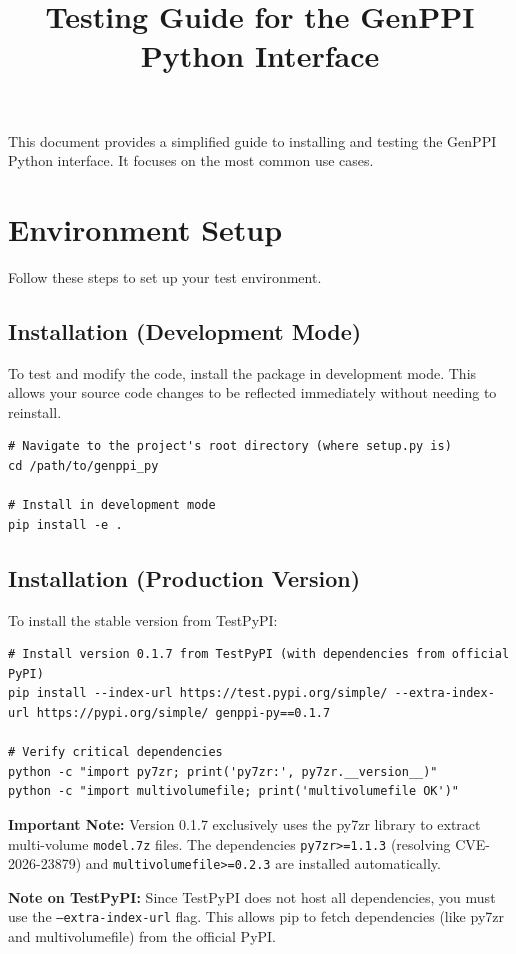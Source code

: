 \documentclass[11pt, a4paper]{article}
\title{\bfseries Testing Guide for the GenPPI Python Interface}
\author{}
\date{}
\begin{document}
\maketitle

This document provides a simplified guide to installing and testing the GenPPI Python interface. It focuses on the most common use cases.

\section{Environment Setup}
Follow these steps to set up your test environment.

\subsection{Installation (Development Mode)}
To test and modify the code, install the package in development mode. This allows your source code changes to be reflected immediately without needing to reinstall.

\begin{lstlisting}[style=bashstyle]
# Navigate to the project's root directory (where setup.py is)
cd /path/to/genppi_py

# Install in development mode
pip install -e .
\end{lstlisting}

\subsection{Installation (Production Version)}
To install the stable version from TestPyPI:

\begin{lstlisting}[style=bashstyle]
# Install version 0.1.7 from TestPyPI (with dependencies from official PyPI)
pip install --index-url https://test.pypi.org/simple/ --extra-index-url https://pypi.org/simple/ genppi-py==0.1.7

# Verify critical dependencies
python -c "import py7zr; print('py7zr:', py7zr.__version__)"
python -c "import multivolumefile; print('multivolumefile OK')"
\end{lstlisting}

\textbf{Important Note:} Version 0.1.7 exclusively uses the py7zr library to extract multi-volume \texttt{model.7z} files. The dependencies \texttt{py7zr>=1.1.3} (resolving CVE-2026-23879) and \texttt{multivolumefile>=0.2.3} are installed automatically.

\textbf{Note on TestPyPI:} Since TestPyPI does not host all dependencies, you must use the \texttt{--extra-index-url} flag. This allows pip to fetch dependencies (like py7zr and multivolumefile) from the official PyPI.
\end{document}
